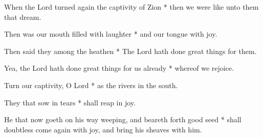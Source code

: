 When the Lord turned again the captivity of Zion * then we were like unto them that dream.

Then was our mouth filled with laughter * and our tongue with joy.

Then said they among the heathen * The Lord hath done great things for them.

Yea, the Lord hath done great things for us already * whereof we rejoice.

Turn our captivity, O Lord * as the rivers in the south.

They that sow in tears * shall reap in joy.

He that now goeth on his way weeping, and beareth forth good seed * shall doubtless come again with joy, and bring his sheaves with him.